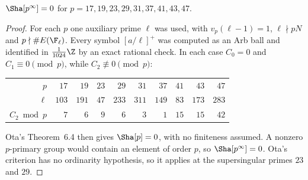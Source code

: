 \begin{theorem}\label{thm:singletons}
$\Sha[p^\infty]=0$ for $p=17,19,23,29,31,37,41,43,47$.
\end{theorem}
\begin{proof}
For each $p$ one auxiliary prime $\ell$ was used, with $v_p(\ell-1)=1$, $\ell\nmid pN$ and $p\nmid\#E(\F_\ell)$. Every symbol $[a/\ell]^+$ was computed as an Arb ball and identified in $\frac1{1024}\Z$ by an exact rational check. In each case $C_0=0$ and $C_1\equiv0\pmod p$, while $C_2\not\equiv0\pmod p$:
\begin{center}
\begin{tabular}{@{}rrrrrrrrrr@{}}
\toprule
$p$ & $17$ & $19$ & $23$ & $29$ & $31$ & $37$ & $41$ & $43$ & $47$\\
$\ell$ & $103$ & $191$ & $47$ & $233$ & $311$ & $149$ & $83$ & $173$ & $283$\\
$C_2\bmod p$ & $7$ & $6$ & $9$ & $6$ & $3$ & $1$ & $15$ & $15$ & $42$\\ \bottomrule
\end{tabular}
\end{center}
Ota's Theorem~6.4 \cite{ota} then gives $\Sha[p]=0$, with no finiteness assumed. A nonzero $p$-primary group would contain an element of order $p$, so $\Sha[p^\infty]=0$. Ota's criterion has no ordinarity hypothesis, so it applies at the supersingular primes $23$ and $29$.
\end{proof}

